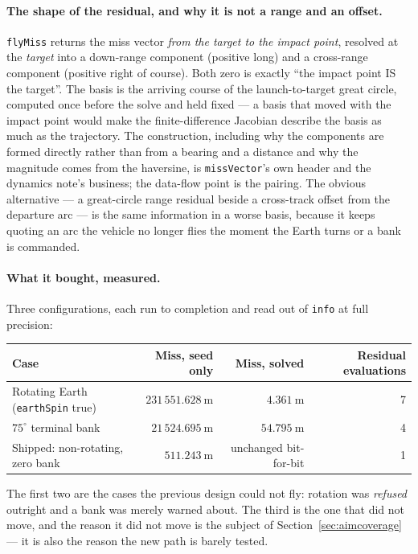 \documentclass[11pt]{article}
\newcommand{\code}[1]{\texttt{#1}}
\begin{document}
\paragraph{The shape of the residual, and why it is not a range and an offset.}
\code{flyMiss} returns the miss vector \emph{from the target to the impact
point}, resolved at the \emph{target} into a down-range component (positive
long) and a cross-range component (positive right of course). Both zero is
exactly ``the impact point IS the target''. The basis is the arriving course of
the launch-to-target great circle, computed once before the solve and held
fixed --- a basis that moved with the impact point would make the
finite-difference Jacobian describe the basis as much as the trajectory. The
construction, including why the components are formed directly rather than
from a bearing and a distance and why the magnitude comes from the haversine,
is \code{missVector}'s own header and the dynamics note's business; the
data-flow point is the pairing. The obvious alternative --- a great-circle
range residual beside a cross-track offset from the departure arc --- is the
same information in a worse basis, because it keeps quoting an arc the vehicle
no longer flies the moment the Earth turns or a bank is commanded.

\paragraph{What it bought, measured.} Three configurations, each run to
completion and read out of \code{info} at full precision:

\begin{center}
\begin{tabular}{lrrr}
\toprule
Case & Miss, seed only & Miss, solved & Residual evaluations \\
\midrule
Rotating Earth (\code{earthSpin} true) & $231\,551.628~\mathrm{m}$ & $4.361~\mathrm{m}$ & 7 \\
$75^\circ$ terminal bank               & $21\,524.695~\mathrm{m}$  & $54.795~\mathrm{m}$ & 4 \\
Shipped: non-rotating, zero bank       & $511.243~\mathrm{m}$      & unchanged bit-for-bit & 1 \\
\bottomrule
\end{tabular}
\end{center}

The first two are the cases the previous design could not fly: rotation was
\emph{refused} outright and a bank was merely warned about. The third is the
one that did not move, and the reason it did not move is the subject of
Section~\ref{sec:aimcoverage} --- it is also the reason the new path is barely
tested.
\end{document}
